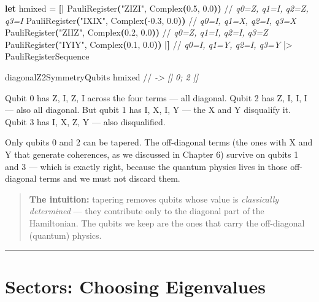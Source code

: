 \documentclass[
  11pt,
  oneside]{book}
\newenvironment{Shaded}{\begin{snugshade}}{\end{snugshade}}
\newcommand{\CommentTok}[1]{\textcolor[rgb]{0.56,0.35,0.01}{\textit{#1}}}
\newcommand{\FloatTok}[1]{\textcolor[rgb]{0.00,0.00,0.81}{#1}}
\newcommand{\KeywordTok}[1]{\textcolor[rgb]{0.13,0.29,0.53}{\textbf{#1}}}
\newcommand{\NormalTok}[1]{#1}
\newcommand{\OperatorTok}[1]{\textcolor[rgb]{0.81,0.36,0.00}{\textbf{#1}}}
\newcommand{\StringTok}[1]{\textcolor[rgb]{0.31,0.60,0.02}{#1}}
\begin{document}
\begin{Shaded}
\begin{Highlighting}[]
\KeywordTok{let}\NormalTok{ hmixed =}
    \OperatorTok{[|}\NormalTok{ PauliRegister}\OperatorTok{(}\StringTok{"ZIZI"}\NormalTok{, Complex}\OperatorTok{(}\FloatTok{0.5}\NormalTok{, }\FloatTok{0.0}\OperatorTok{))}\NormalTok{   //}\CommentTok{ q0=Z, q1=I, q2=Z, q3=I}
\NormalTok{       PauliRegister}\OperatorTok{(}\StringTok{"IXIX"}\NormalTok{, Complex}\OperatorTok{(}\FloatTok{{-}0.3}\NormalTok{, }\FloatTok{0.0}\OperatorTok{))}\NormalTok{   //}\CommentTok{ q0=I, q1=X, q2=I, q3=X}
\NormalTok{       PauliRegister}\OperatorTok{(}\StringTok{"ZIIZ"}\NormalTok{, Complex}\OperatorTok{(}\FloatTok{0.2}\NormalTok{, }\FloatTok{0.0}\OperatorTok{))}\NormalTok{    //}\CommentTok{ q0=Z, q1=I, q2=I, q3=Z}
\NormalTok{       PauliRegister}\OperatorTok{(}\StringTok{"IYIY"}\NormalTok{, Complex}\OperatorTok{(}\FloatTok{0.1}\NormalTok{, }\FloatTok{0.0}\OperatorTok{))} \OperatorTok{|]}\NormalTok{ //}\CommentTok{ q0=I, q1=Y, q2=I, q3=Y}
\NormalTok{    |\textgreater{} PauliRegisterSequence}

\NormalTok{diagonalZ2SymmetryQubits hmixed}
\NormalTok{//}\CommentTok{ -> [| 0; 2 |]}
\end{Highlighting}
\end{Shaded}

Qubit 0 has Z, I, Z, I across the four terms --- all diagonal. Qubit 2
has Z, I, I, I --- also all diagonal. But qubit 1 has I, X, I, Y --- the
X and Y disqualify it. Qubit 3 has I, X, Z, Y --- also disqualified.

Only qubits 0 and 2 can be tapered. The off-diagonal terms (the ones
with X and Y that generate coherences, as we discussed in Chapter 6)
survive on qubits 1 and 3 --- which is exactly right, because the
quantum physics lives in those off-diagonal terms and we must not
discard them.

\begin{quote}
\textbf{The intuition:} tapering removes qubits whose value is
\emph{classically determined} --- they contribute only to the diagonal
part of the Hamiltonian. The qubits we keep are the ones that carry the
off-diagonal (quantum) physics.
\end{quote}

\begin{center}\rule{0.5\linewidth}{0.5pt}\end{center}

\section{Sectors: Choosing
Eigenvalues}\label{sectors-choosing-eigenvalues}
\end{document}
